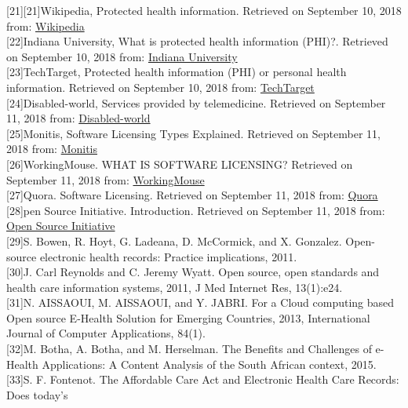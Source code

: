 \documentclass[a4paper]{article}
\begin{document}
[21][21]Wikipedia, Protected health information. Retrieved on September 10, 2018 from: \href{https://en.wikipedia.org/wiki/Protected_health_information}{Wikipedia}\\
[22][22]Indiana University, What is protected health information (PHI)?. Retrieved on September 10, 2018 from: \href{https://kb.iu.edu/d/ayyz}{Indiana University}\\
[23][23]TechTarget, Protected health information (PHI) or personal health information. Retrieved on September 10, 2018 from: \href{https://searchhealthit.techtarget.com/definition/personal-health-information}{TechTarget}\\
[24][24]Disabled-world, Services provided by telemedicine. Retrieved on September 11, 2018 from: \href{https://www.disabled-world.com/medical/ehealth/}{Disabled-world}\\
[25][25]Monitis, Software Licensing Types Explained. Retrieved on September 11, 2018 from: \href{http://www.monitis.com/blog/software-licensing-types-explained/}{Monitis}\\
[26][26]WorkingMouse. WHAT IS SOFTWARE LICENSING? Retrieved on September 11, 2018 from: \href{https://workingmouse.com.au/innovation/software-licensing-why-its-important-and-how-it-can-help-you}{WorkingMouse}\\
[27][27]Quora. Software Licensing. Retrieved on September 11, 2018 from: \href{https://www.quora.com/What-are-different-types-of-software-licenses}{Quora}\\
[28][28]pen Source Initiative. Introduction. Retrieved on September 11, 2018 from: \href{https://opensource.org/osd-annotated}{Open Source Initiative}\\
[29][29]S. Bowen, R. Hoyt, G. Ladeana, D. McCormick, and X. Gonzalez. Open-source electronic health records: Practice implications, 2011. \\
[30][30]J. Carl Reynolds and C. Jeremy Wyatt. Open source, open
standards and health care information systems, 2011, J Med
Internet Res, 13(1):e24.\\
[31][31]N. AISSAOUI, M. AISSAOUI, and Y. JABRI. For a Cloud computing based Open source E-Health
Solution for Emerging Countries, 2013, International Journal of Computer Applications, 84(1).\\
[32][32]M. Botha,  A. Botha, and M. Herselman. The Benefits and Challenges of e-Health Applications: A Content Analysis of the
South African context, 2015.\\
[33][33]S. F. Fontenot. The Affordable Care Act and
Electronic Health Care Records: Does today’s
\end{document}

